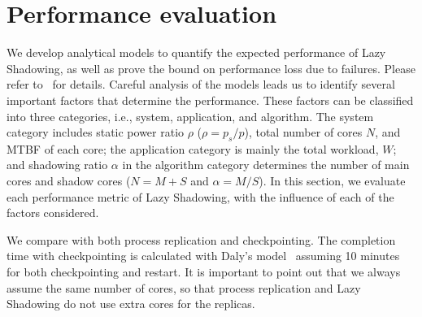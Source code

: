 \section{Performance evaluation}
We develop analytical models to quantify
the expected performance of Lazy Shadowing, as well as
prove the bound on performance loss due to failures.
 Please refer to~\cite{cui_2016_scalcom} for details. 
Careful analysis of the models leads us to identify several important factors that determine the performance. These factors can be classified into three categories, i.e., system, application, and algorithm. The system category includes static power ratio $\rho$ ($\rho=p_s/p$), total number of cores $N$, and MTBF of each core; the application category is mainly the total workload, $W$; and shadowing ratio $\alpha$ in the algorithm category determines the number of main cores and shadow cores ($N=M+S$ and $\alpha=M/S$). In this section, we evaluate each performance metric of Lazy Shadowing, 
 with the influence of each of the factors considered.

We compare with both process replication and checkpointing. %
The completion time with checkpointing is calculated with Daly's model~\cite{daly_fgcs_2006} assuming 10 minutes for both checkpointing and restart. %
It is important to point out that we always assume the same number of cores, so that process replication and Lazy Shadowing do not use extra cores for the replicas. 


